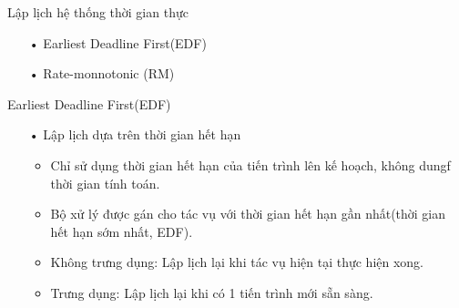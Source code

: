 \documentclass{beamer}
\newcommand{\bi}{\begin{itemize}}
\newcommand{\ei}{\end{itemize}}
\begin{document}
\begin{frame}{Lập lịch hệ thống thời gian thực}
\begin{itemize}
\item[•] Earliest Deadline First(EDF)
\item[•] Rate-monnotonic (RM)
\end{itemize}
\end{frame}
\begin{frame}{Earliest Deadline First(EDF)}
\begin{itemize}
\item[•] Lập lịch dựa trên thời gian hết hạn
\bi
\item Chỉ sử dụng thời gian hết hạn của tiến trình lên kế hoạch, không dungf thời gian tính toán.
\item Bộ xử lý được gán cho tác vụ với thời gian hết hạn gần nhất(thời gian hết hạn sớm nhất, EDF).
\item Không trưng dụng: Lập lịch lại khi tác vụ hiện tại thực hiện xong.
\item Trưng dụng: Lập lịch lại khi có 1 tiến trình mới sẵn sàng.
\ei
\end{itemize}
\end{frame}
\end{document}
